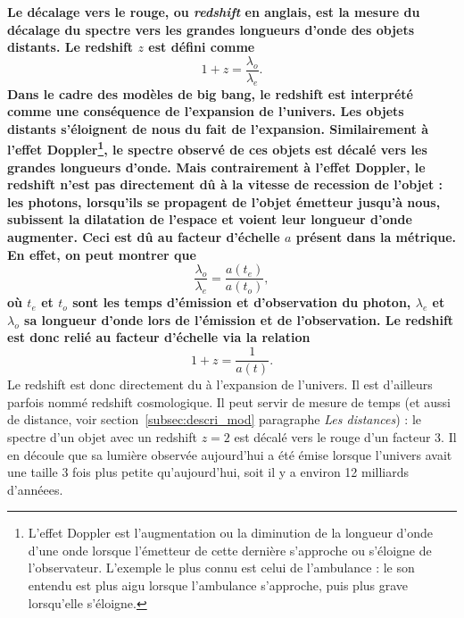 \documentclass[11pt, twoside, a4paper, openright]{report}
\begin{document}
\textbf{
Le décalage vers le rouge, ou \emph{redshift} en anglais, est la mesure du décalage du spectre vers les grandes longueurs d'onde des objets distants. Le redshift $z$ est défini comme 
\begin{equation}
  \label{eq:redshift}
  1 + z = \frac{\lambda_o}{\lambda_e} .
\end{equation}
Dans le cadre des modèles de big bang, le redshift est interprété comme une conséquence de l'expansion de l'univers.
Les objets distants s'éloignent de nous du fait de l'expansion. Similairement à l'effet Doppler\footnote{L'effet Doppler est l'augmentation ou la diminution de la longueur d'onde d'une onde lorsque l'émetteur de cette dernière s'approche ou s'éloigne de l'observateur. L'exemple le plus connu est celui de l'ambulance : le son entendu est plus aigu lorsque l'ambulance s'approche, puis plus grave lorsqu'elle s'éloigne.}, le spectre observé de ces objets est décalé vers les grandes longueurs d'onde. Mais contrairement à l'effet Doppler, le redshift n'est pas directement dû à la vitesse de recession de l'objet : les photons, lorsqu'ils se propagent de l'objet émetteur jusqu'à nous, subissent la dilatation de l'espace et voient leur longueur d'onde augmenter. Ceci est dû au facteur d'échelle $a$ présent dans la métrique. En effet, on peut montrer que
\begin{equation}
  \frac{\lambda_o}{\lambda_e} = \frac{a(t_e)}{a(t_o)} ,
\end{equation}
où $t_e$ et $t_o$ sont les temps d'émission et d'observation du photon, $\lambda_{e}$  et $\lambda_{o}$ sa longueur d'onde lors de l'émission et de l'observation. Le redshift est donc relié au facteur d'échelle via la relation
\begin{equation}
  \label{eq:redshift2}
  1 + z = \frac{1}{a(t)}.
\end{equation} }
Le redshift est donc directement du à l'expansion de l'univers. Il est d'ailleurs parfois nommé redshift cosmologique. Il peut servir de mesure de temps (et aussi de distance, voir section~\ref{subsec:descri_mod} paragraphe \emph{Les distances}) : le spectre d'un objet avec un redshift $z=2$ est décalé vers le rouge d'un facteur 3. Il en découle que sa lumière observée aujourd'hui a été émise lorsque l'univers avait une taille 3 fois plus petite qu'aujourd'hui, soit il y a environ 12 milliards d'annéees.
\end{document}
